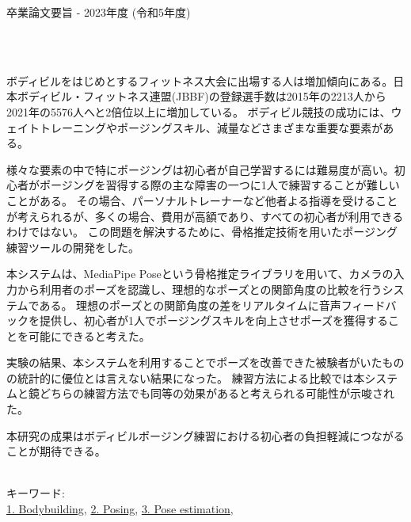 卒業論文要旨 - 2023年度 (令和5年度)
\begin{center}
\begin{large}
\end{large}　
\end{center}

~ \\
  ボディビルをはじめとするフィットネス大会に出場する人は増加傾向にある。日本ボディビル・フィットネス連盟(JBBF)の登録選手数は2015年の2213人から2021年の5576人へと2倍位以上に増加している\cite{jbbf}。
  ボディビル競技の成功には、ウェイトトレーニングやポージングスキル、減量などさまざまな重要な要素がある。

  様々な要素の中で特にポージングは初心者が自己学習するには難易度が高い。初心者がポージングを習得する際の主な障害の一つに1人で練習することが難しいことがある。
  その場合、パーソナルトレーナーなど他者よる指導を受けることが考えられるが、多くの場合、費用が高額であり、すべての初心者が利用できるわけではない。
  この問題を解決するために、骨格推定技術を用いたポージング練習ツールの開発をした。

  本システムは、MediaPipe Poseという骨格推定ライブラリを用いて、カメラの入力から利用者のポーズを認識し、理想的なポーズとの関節角度の比較を行うシステムである。
  理想のポーズとの関節角度の差をリアルタイムに音声フィードバックを提供し、初心者が1人でポージングスキルを向上させポーズを獲得することを可能にできると考えた。

  実験の結果、本システムを利用することでポーズを改善できた被験者がいたものの統計的に優位とは言えない結果になった。
  練習方法による比較では本システムと鏡どちらの練習方法でも同等の効果があると考えられる可能性が示唆された。

  本研究の成果はボディビルポージング練習における初心者の負担軽減につながることが期待できる。

~ \\
キーワード:\\
\underline{1. Bodybuilding},
\underline{2. Posing},
\underline{3. Pose estimation},
\begin{flushright}
\dept \\
\author
\end{flushright}

